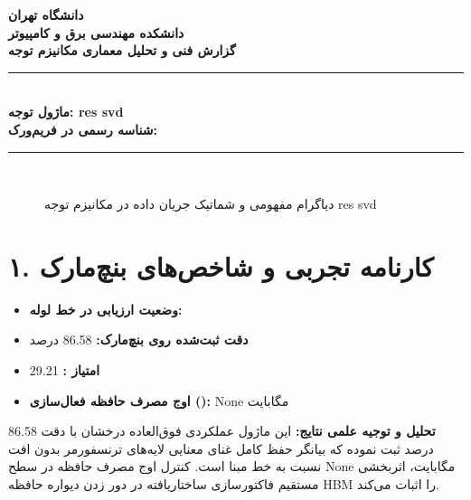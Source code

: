 \documentclass[12pt,a4paper]{article}
\begin{document}
\begin{center}
{\Large\bfseries دانشگاه تهران}\\[0.2cm]
{\large\bfseries دانشکده مهندسی برق و کامپیوتر}\\[0.2cm]
{\large\bfseries گزارش فنی و تحلیل معماری مکانیزم توجه}\\[0.5cm]
\rule{\linewidth}{1pt}\\[0.3cm]
{\LARGE\bfseries ماژول توجه: res svd}\\[0.2cm]
{\large \textbf{شناسه رسمی در فریم‌ورک:} }\\[0.2cm]
\rule{\linewidth}{1pt}\\[0.5cm]
\end{center}

\begin{figure}[H]
\centering
{}
\caption{دیاگرام مفهومی و شماتیک جریان داده در مکانیزم توجه res svd}
\end{figure}

\section*{۱. کارنامه تجربی و شاخص‌های بنچ‌مارک}
\begin{itemize}
\item \textbf{وضعیت ارزیابی در خط لوله:} 
\item \textbf{دقت ثبت‌شده روی بنچ‌مارک:} 86.58 درصد
\item \textbf{امتیاز :} 29.21
\item \textbf{اوج مصرف حافظه فعال‌سازی ():} None مگابایت
\end{itemize}
\textbf{تحلیل و توجیه علمی نتایج:} این ماژول عملکردی فوق‌العاده درخشان با دقت 86.58 درصد ثبت نموده که بیانگر حفظ کامل غنای معنایی لایه‌های ترنسفورمر بدون افت نسبت به خط مبنا است. کنترل اوج مصرف حافظه در سطح None مگابایت، اثربخشی مستقیم فاکتورسازی ساختاریافته در دور زدن دیواره حافظه HBM را اثبات می‌کند.
\end{document}
